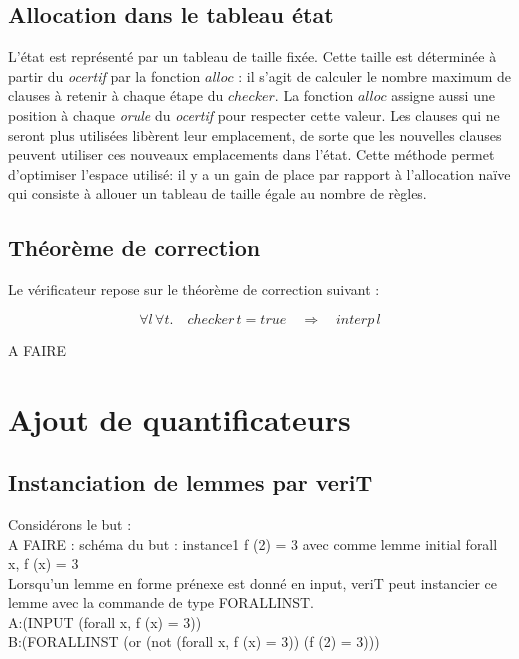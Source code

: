 \documentclass[11pt]{article}
\begin{document}
\subsection{Allocation dans le tableau état} \label{alloc}

L'état est représenté par un tableau de taille fixée. Cette taille est déterminée à partir du \textit{ocertif} par la fonction $alloc$ : il s'agit de calculer le nombre maximum de clauses à retenir à chaque étape du $checker$. La fonction $alloc$ assigne aussi une position à chaque \textit{orule} du \textit{ocertif} pour respecter cette valeur. Les clauses qui ne seront plus utilisées libèrent leur emplacement, de sorte que les nouvelles clauses peuvent utiliser ces nouveaux emplacements dans l'état. Cette méthode permet d'optimiser l'espace utilisé: il y a un gain de place par rapport à l'allocation naïve qui consiste à allouer un tableau de taille égale au nombre de règles.


\subsection{Théorème de correction}

Le vérificateur repose sur le théorème de correction suivant :

\[ \forall l \, \forall t. \quad checker \, t = true \quad \Rightarrow \quad interp \, l \]

A FAIRE





\newpage
\section{Ajout de quantificateurs}

\subsection{Instanciation de lemmes par veriT}

Considérons le but : \\

A FAIRE : schéma du but : instance1 f (2) = 3 avec comme lemme initial forall x, f (x) = 3 \\

Lorsqu'un lemme en forme prénexe est donné en input, veriT peut instancier ce lemme avec la commande de type FORALLINST. \\

A:(INPUT (forall x, f (x) = 3)) \\
B:(FORALLINST (or (not (forall x, f (x) = 3)) (f (2) = 3))) \\
\end{document}
